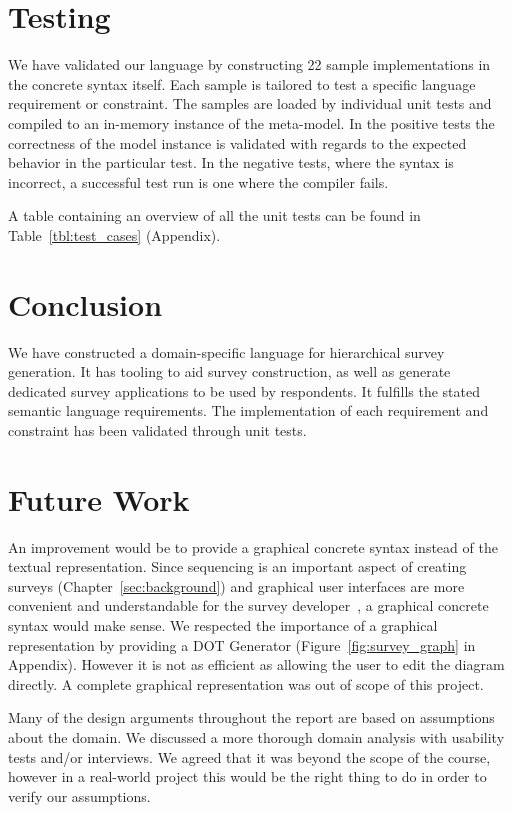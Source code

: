 \documentclass[runningheads,a4paper]{llncs}
\begin{document}
\section{Testing}
We have validated our language by constructing 22 sample implementations in the concrete syntax itself. Each sample is tailored to test a specific language requirement or constraint. The samples are loaded by individual unit tests and compiled to an in-memory instance of the meta-model. In the positive tests the correctness of the model instance is validated with regards to the expected behavior in the particular test. In the negative tests, where the syntax is incorrect, a successful test run is one where the compiler fails.

A table containing an overview of all the unit tests can be found in Table~\ref{tbl:test_cases} (Appendix).

\section{Conclusion}
We have constructed a domain-specific language for hierarchical survey generation. It has tooling to aid survey construction, as well as generate dedicated survey applications to be used by respondents. It fulfills the stated semantic language requirements. The implementation of each requirement and constraint has been validated through unit tests.

\section{Future Work}
An improvement would be to provide a graphical concrete syntax instead of the textual representation. Since sequencing is an important aspect of creating surveys (Chapter~\ref{sec:background}) and graphical user interfaces are more convenient and understandable for the survey developer~\cite{karsai}, a graphical concrete syntax would make sense. We respected the importance of a graphical representation by providing a DOT Generator (Figure~\ref{fig:survey_graph} in Appendix). However it is not as efficient as allowing the user to edit the diagram directly. A complete graphical representation was out of scope of this project.

Many of the design arguments throughout the report are based on assumptions about the domain. We discussed a more thorough domain analysis with usability tests and/or interviews. We agreed that it was beyond the scope of the course, however in a real-world project this would be the right thing to do in order to verify our assumptions.
\end{document}
